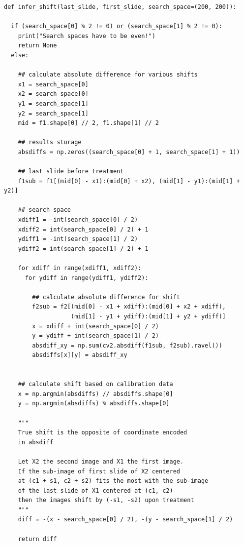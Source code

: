 \documentclass[pdftex,12pt,a4paper]{report}
\begin{document}
\begin{appendices}
\begin{verbatim}
def infer_shift(last_slide, first_slide, search_space=(200, 200)):
    
  if (search_space[0] % 2 != 0) or (search_space[1] % 2 != 0):
    print("Search spaces have to be even!")
    return None
  else:
    
    ## calculate absolute difference for various shifts
    x1 = search_space[0]
    x2 = search_space[0]
    y1 = search_space[1]
    y2 = search_space[1]
    mid = f1.shape[0] // 2, f1.shape[1] // 2
        
    ## results storage        
    absdiffs = np.zeros((search_space[0] + 1, search_space[1] + 1))

    ## last slide before treatment
    f1sub = f1[(mid[0] - x1):(mid[0] + x2), (mid[1] - y1):(mid[1] + y2)]
    
    ## search space 
    xdiff1 = -int(search_space[0] / 2)
    xdiff2 = int(search_space[0] / 2) + 1
    ydiff1 = -int(search_space[1] / 2)
    ydiff2 = int(search_space[1] / 2) + 1
    
    for xdiff in range(xdiff1, xdiff2):
      for ydiff in range(ydiff1, ydiff2):
      
        ## calculate absolute difference for shift
        f2sub = f2[(mid[0] - x1 + xdiff):(mid[0] + x2 + xdiff), 
                   (mid[1] - y1 + ydiff):(mid[1] + y2 + ydiff)]
        x = xdiff + int(search_space[0] / 2)
        y = ydiff + int(search_space[1] / 2)
        absdiff_xy = np.sum(cv2.absdiff(f1sub, f2sub).ravel())
        absdiffs[x][y] = absdiff_xy
        
        
    ## calculate shift based on calibration data
    x = np.argmin(absdiffs) // absdiffs.shape[0]
    y = np.argmin(absdiffs) % absdiffs.shape[0]
    
    """
    True shift is the opposite of coordinate encoded
    in absdiff
    
    Let X2 the second image and X1 the first image.
    If the sub-image of first slide of X2 centered
    at (c1 + s1, c2 + s2) fits the most with the sub-image
    of the last slide of X1 centered at (c1, c2)
    then the images shift by (-s1, -s2) upon treatment
    """
    diff = -(x - search_space[0] / 2), -(y - search_space[1] / 2)

    return diff
\end{verbatim}

\end{appendices}
\end{document}
